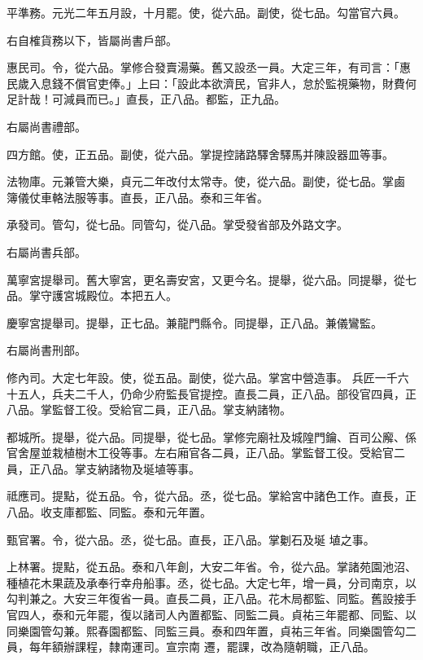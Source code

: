 \begin{pinyinscope}
 平準務。元光二年五月設，十月罷。使，從六品。副使，從七品。勾當官六員。



 右自榷貨務以下，皆屬尚書戶部。



 惠民司。令，從六品。掌修合發賣湯藥。舊又設丞一員。大定三年，有司言：「惠民歲入息錢不償官吏俸。」上曰：「設此本欲濟民，官非人，怠於監視藥物，財費何足計哉！可減員而已。」直長，正八品。都監，正九品。



 右屬尚書禮部。



 四方館。使，正五品。副使，從六品。掌提控諸路驛舍驛馬并陳設器皿等事。



 法物庫。元兼管大樂，貞元二年改付太常寺。使，從六品。副使，從七品。掌鹵
 簿儀仗車輅法服等事。直長，正八品。泰和三年省。



 承發司。管勾，從七品。同管勾，從八品。掌受發省部及外路文字。



 右屬尚書兵部。



 萬寧宮提舉司。舊大寧宮，更名壽安宮，又更今名。提舉，從六品。同提舉，從七品。掌守護宮城殿位。本把五人。



 慶寧宮提舉司。提舉，正七品。兼龍門縣令。同提舉，正八品。兼儀鸞監。



 右屬尚書刑部。



 修內司。大定七年設。使，從五品。副使，從六品。掌宮中營造事。
 兵匠一千六十五人，兵夫二千人，仍命少府監長官提控。直長二員，正八品。部役官四員，正八品。掌監督工役。受給官二員，正八品。掌支納諸物。



 都城所。提舉，從六品。同提舉，從七品。掌修完廟社及城隍門鑰、百司公廨、係官舍屋並栽植樹木工役等事。左右廂官各二員，正八品。掌監督工役。受給官二員，正八品。掌支納諸物及埏埴等事。



 祗應司。提點，從五品。令，從六品。丞，從七品。掌給宮中諸色工作。直長，正八品。收支庫都監、同監。泰和元年置。



 甄官署。令，從六品。丞，從七品。直長，正八品。掌劖石及埏
 埴之事。



 上林署。提點，從五品。泰和八年創，大安二年省。令，從六品。掌諸苑園池沼、種植花木果蔬及承奉行幸舟船事。丞，從七品。大定七年，增一員，分司南京，以勾判兼之。大安三年復省一員。直長二員，正八品。花木局都監、同監。舊設接手官四人，泰和元年罷，復以諸司人內置都監、同監二員。貞祐三年罷都、同監、以同樂園管勾兼。熙春園都監、同監三員。泰和四年置，貞祐三年省。同樂園管勾二員，每年額辦課程，隸南運司。宣宗南
 遷，罷課，改為隨朝職，正八品。




\end{pinyinscope}
